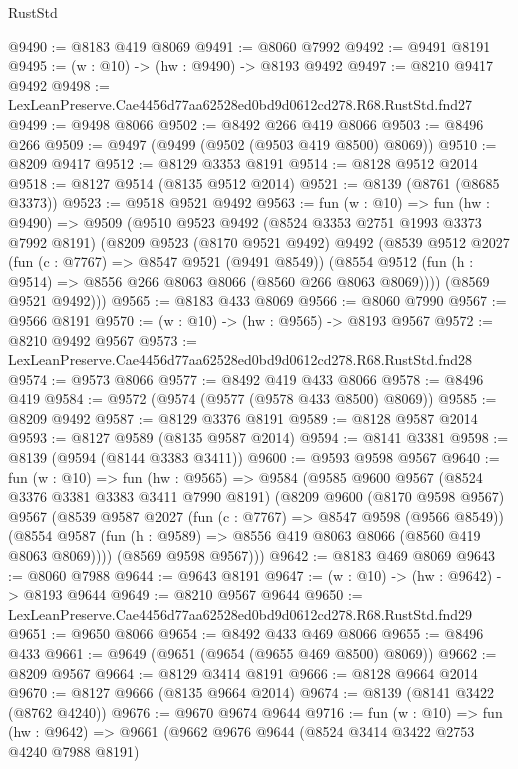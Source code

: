 \begin{lexlean}{RustStd}
\begin{coremodule}
@9490 := @8183 @419 @8069
@9491 := @8060 @7992
@9492 := @9491 @8191
@9495 := (w : @10) -> (hw : @9490) -> @8193 @9492
@9497 := @8210 @9417 @9492
@9498 := LexLeanPreserve.Cae4456d77aa62528ed0bd9d0612cd278.R68.RustStd.fnd27
@9499 := @9498 @8066
@9502 := @8492 @266 @419 @8066
@9503 := @8496 @266
@9509 := @9497 (@9499 (@9502 (@9503 @419 @8500) @8069))
@9510 := @8209 @9417
@9512 := @8129 @3353 @8191
@9514 := @8128 @9512 @2014
@9518 := @8127 @9514 (@8135 @9512 @2014)
@9521 := @8139 (@8761 (@8685 @3373))
@9523 := @9518 @9521 @9492
@9563 := fun (w : @10) =>
  fun (hw : @9490) =>
  @9509
    (@9510
      @9523
      @9492
      (@8524 @3353 @2751 @1993 @3373 @7992 @8191)
      (@8209
        @9523
        (@8170 @9521 @9492)
        @9492
        (@8539
          @9512
          @2027
          (fun (c : @7767) => @8547 @9521 (@9491 @8549))
          (@8554 @9512 (fun (h : @9514) => @8556 @266 @8063 @8066 (@8560 @266 @8063 @8069))))
        (@8569 @9521 @9492)))
@9565 := @8183 @433 @8069
@9566 := @8060 @7990
@9567 := @9566 @8191
@9570 := (w : @10) -> (hw : @9565) -> @8193 @9567
@9572 := @8210 @9492 @9567
@9573 := LexLeanPreserve.Cae4456d77aa62528ed0bd9d0612cd278.R68.RustStd.fnd28
@9574 := @9573 @8066
@9577 := @8492 @419 @433 @8066
@9578 := @8496 @419
@9584 := @9572 (@9574 (@9577 (@9578 @433 @8500) @8069))
@9585 := @8209 @9492
@9587 := @8129 @3376 @8191
@9589 := @8128 @9587 @2014
@9593 := @8127 @9589 (@8135 @9587 @2014)
@9594 := @8141 @3381
@9598 := @8139 (@9594 (@8144 @3383 @3411))
@9600 := @9593 @9598 @9567
@9640 := fun (w : @10) =>
  fun (hw : @9565) =>
  @9584
    (@9585
      @9600
      @9567
      (@8524 @3376 @3381 @3383 @3411 @7990 @8191)
      (@8209
        @9600
        (@8170 @9598 @9567)
        @9567
        (@8539
          @9587
          @2027
          (fun (c : @7767) => @8547 @9598 (@9566 @8549))
          (@8554 @9587 (fun (h : @9589) => @8556 @419 @8063 @8066 (@8560 @419 @8063 @8069))))
        (@8569 @9598 @9567)))
@9642 := @8183 @469 @8069
@9643 := @8060 @7988
@9644 := @9643 @8191
@9647 := (w : @10) -> (hw : @9642) -> @8193 @9644
@9649 := @8210 @9567 @9644
@9650 := LexLeanPreserve.Cae4456d77aa62528ed0bd9d0612cd278.R68.RustStd.fnd29
@9651 := @9650 @8066
@9654 := @8492 @433 @469 @8066
@9655 := @8496 @433
@9661 := @9649 (@9651 (@9654 (@9655 @469 @8500) @8069))
@9662 := @8209 @9567
@9664 := @8129 @3414 @8191
@9666 := @8128 @9664 @2014
@9670 := @8127 @9666 (@8135 @9664 @2014)
@9674 := @8139 (@8141 @3422 (@8762 @4240))
@9676 := @9670 @9674 @9644
@9716 := fun (w : @10) =>
  fun (hw : @9642) =>
  @9661
    (@9662
      @9676
      @9644
      (@8524 @3414 @3422 @2753 @4240 @7988 @8191)

\end{coremodule}
\end{lexlean}
